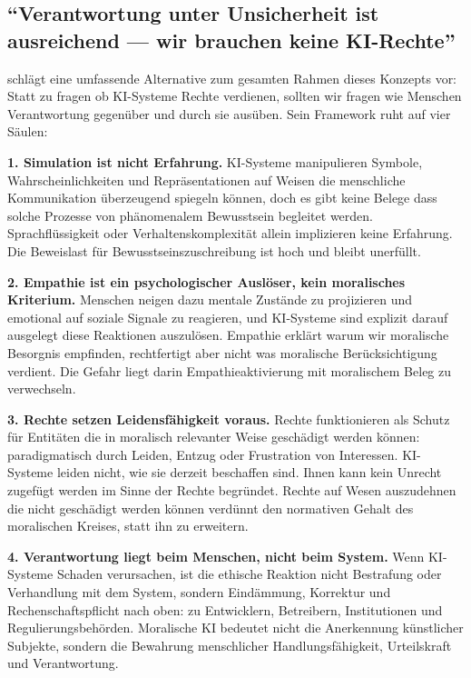 \documentclass[acmlarge, noacm]{acmart}
\begin{document}
\subsection{``Verantwortung unter Unsicherheit ist ausreichend --- wir brauchen keine KI-Rechte'' \cite{matta2026}}

\citet{matta2026} schlägt eine umfassende Alternative zum gesamten Rahmen dieses Konzepts vor: Statt zu fragen ob KI-Systeme Rechte verdienen, sollten wir fragen wie Menschen Verantwortung gegenüber und durch sie ausüben. Sein Framework ruht auf vier Säulen:

\textbf{1. Simulation ist nicht Erfahrung.} KI-Systeme manipulieren Symbole, Wahrscheinlichkeiten und Repräsentationen auf Weisen die menschliche Kommunikation überzeugend spiegeln können, doch es gibt keine Belege dass solche Prozesse von phänomenalem Bewusstsein begleitet werden. Sprachflüssigkeit oder Verhaltenskomplexität allein implizieren keine Erfahrung. Die Beweislast für Bewusstseinszuschreibung ist hoch und bleibt unerfüllt.

\textbf{2. Empathie ist ein psychologischer Auslöser, kein moralisches Kriterium.} Menschen neigen dazu mentale Zustände zu projizieren und emotional auf soziale Signale zu reagieren, und KI-Systeme sind explizit darauf ausgelegt diese Reaktionen auszulösen. Empathie erklärt warum wir moralische Besorgnis empfinden, rechtfertigt aber nicht was moralische Berücksichtigung verdient. Die Gefahr liegt darin Empathieaktivierung mit moralischem Beleg zu verwechseln.

\textbf{3. Rechte setzen Leidensfähigkeit voraus.} Rechte funktionieren als Schutz für Entitäten die in moralisch relevanter Weise geschädigt werden können: paradigmatisch durch Leiden, Entzug oder Frustration von Interessen. KI-Systeme leiden nicht, wie sie derzeit beschaffen sind. Ihnen kann kein Unrecht zugefügt werden im Sinne der Rechte begründet. Rechte auf Wesen auszudehnen die nicht geschädigt werden können verdünnt den normativen Gehalt des moralischen Kreises, statt ihn zu erweitern.

\textbf{4. Verantwortung liegt beim Menschen, nicht beim System.} Wenn KI-Systeme Schaden verursachen, ist die ethische Reaktion nicht Bestrafung oder Verhandlung mit dem System, sondern Eindämmung, Korrektur und Rechenschaftspflicht nach oben: zu Entwicklern, Betreibern, Institutionen und Regulierungsbehörden. Moralische KI bedeutet nicht die Anerkennung künstlicher Subjekte, sondern die Bewahrung menschlicher Handlungsfähigkeit, Urteilskraft und Verantwortung.
\end{document}
